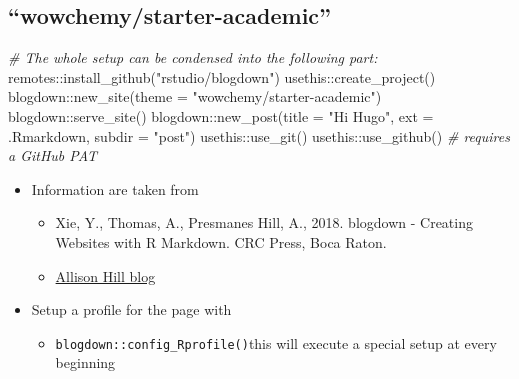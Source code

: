 \documentclass[
]{article}
\newenvironment{Shaded}{\begin{snugshade}}{\end{snugshade}}
\newcommand{\AttributeTok}[1]{\textcolor[rgb]{0.77,0.63,0.00}{#1}}
\newcommand{\CommentTok}[1]{\textcolor[rgb]{0.56,0.35,0.01}{\textit{#1}}}
\newcommand{\FunctionTok}[1]{\textcolor[rgb]{0.00,0.00,0.00}{#1}}
\newcommand{\NormalTok}[1]{#1}
\newcommand{\SpecialCharTok}[1]{\textcolor[rgb]{0.00,0.00,0.00}{#1}}
\newcommand{\StringTok}[1]{\textcolor[rgb]{0.31,0.60,0.02}{#1}}
\providecommand{\tightlist}{%
  \setlength{\itemsep}{0pt}\setlength{\parskip}{0pt}}
\begin{document}
\hypertarget{wowchemystarter-academic}{%
\subsection{``wowchemy/starter-academic''}\label{wowchemystarter-academic}}

\begin{Shaded}
\begin{Highlighting}[]
\CommentTok{\# The whole setup can be condensed into the following part:}
\NormalTok{remotes}\SpecialCharTok{::}\FunctionTok{install\_github}\NormalTok{(}\StringTok{"rstudio/blogdown"}\NormalTok{)}
\NormalTok{usethis}\SpecialCharTok{::}\FunctionTok{create\_project}\NormalTok{()}
\NormalTok{blogdown}\SpecialCharTok{::}\FunctionTok{new\_site}\NormalTok{(}\AttributeTok{theme =} \StringTok{"wowchemy/starter{-}academic"}\NormalTok{)}
\NormalTok{blogdown}\SpecialCharTok{::}\FunctionTok{serve\_site}\NormalTok{()}
\NormalTok{blogdown}\SpecialCharTok{::}\FunctionTok{new\_post}\NormalTok{(}\AttributeTok{title =} \StringTok{"Hi Hugo"}\NormalTok{, }
                     \AttributeTok{ext =} \StringTok{\textquotesingle{}.Rmarkdown\textquotesingle{}}\NormalTok{, }
                     \AttributeTok{subdir =} \StringTok{"post"}\NormalTok{)}
\NormalTok{usethis}\SpecialCharTok{::}\FunctionTok{use\_git}\NormalTok{()}
\NormalTok{usethis}\SpecialCharTok{::}\FunctionTok{use\_github}\NormalTok{() }\CommentTok{\# requires a GitHub PAT}
\end{Highlighting}
\end{Shaded}

\begin{itemize}
\tightlist
\item
  Information are taken from

  \begin{itemize}
  \tightlist
  \item
    Xie, Y., Thomas, A., Presmanes Hill, A., 2018. blogdown -
    Creating Websites with R Markdown. CRC Press, Boca Raton.
  \item
    \href{https://alison.rbind.io/post/new-year-new-blogdown/\#pre-requisites}{Allison Hill
    blog}
  \end{itemize}
\item
  Setup a profile for the page with

  \begin{itemize}
  \tightlist
  \item
    \texttt{blogdown::config\_Rprofile()}this will execute a special setup
    at every beginning
  \end{itemize}
\end{itemize}
\end{document}

